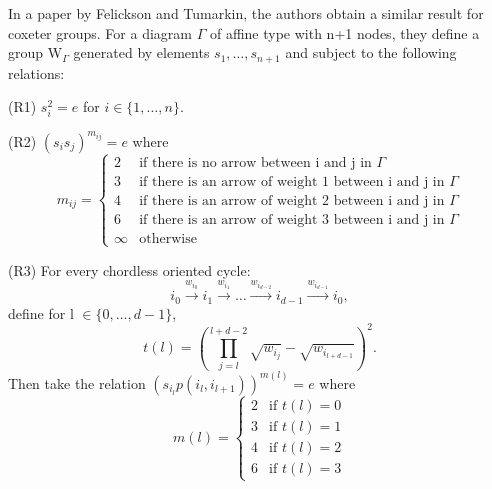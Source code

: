 \documentclass{beamer}
\begin{document}
\begin{frame}
In a paper by Felickson and Tumarkin, the authors obtain a similar result for coxeter groups. For a diagram $\Gamma$ of affine type with n+1 nodes, they define a group W$_{\Gamma}$ generated by elements $s_{1}, \dots, s_{n+1}$ and subject to the following relations:

(R1) $s_{i}^{2} = e$ for $i \in \{1, \dots, n\}$.

(R2) $(s_{i}s_{j})^{m_{ij}} = e$ where 
$$m_{ij} = 
\begin{cases}
2 &\text{if there is no arrow between i and j in $\Gamma$} \\
3 &\text{if there is an arrow of weight 1 between i and j in $\Gamma$} \\
4 &\text{if there is an arrow of weight 2 between i and j in $\Gamma$} \\
6 &\text{if there is an arrow of weight 3 between i and j in $\Gamma$} \\
\infty &\text{otherwise}
\end{cases}$$
\end{frame}

\begin{frame}
(R3) For every chordless oriented cycle:
$$i_{0} \stackrel{w_{i_{0}}}{\longrightarrow} i_{1} \stackrel{w_{i_{1}}}{\longrightarrow} \dots \stackrel{w_{i_{d-2}}}{\longrightarrow} i_{d-1} \stackrel{w_{i_{d-1}}}{\longrightarrow} i_{0},$$
define for l $\in \{0, \dots, d-1\}$, 
$$t(l) = (\prod_{j=l}^{l+d-2}{\sqrt{w_{i_{j}}}} - \sqrt{w_{i_{l+d-1}}})^{2}.$$
Then take the relation $(s_{i_{l}}p(i_{l}, i_{l+1}))^{m(l)} = e$ where
$$m(l) =
\begin{cases}
2 &\text{if $t(l)=0$} \\
3 &\text{if $t(l)=1$} \\
4 &\text{if $t(l)=2$} \\
6 &\text{if $t(l)=3$}
\end{cases}$$
\end{frame}
\end{document}
